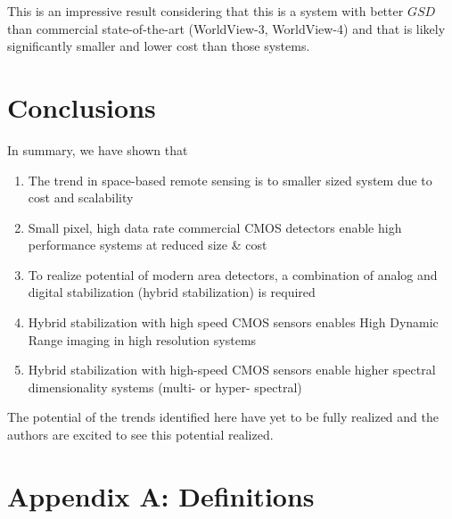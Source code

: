 \documentclass[]{spieman}  %
\begin{document}
This is an impressive result considering that this is a system with better $GSD$ than commercial state-of-the-art (WorldView-3, WorldView-4) and that is likely significantly smaller and lower cost than those systems.

\section{Conclusions}
\label{sec:conclusions}

In summary, we have shown that

\begin{enumerate}
    \item The trend in space-based remote sensing is to smaller sized system due to cost and scalability
    \item Small pixel, high data rate commercial CMOS detectors enable high performance systems at reduced size \& cost
    \item To realize potential of modern area detectors, a combination of analog and digital stabilization (hybrid stabilization) is required
    \item Hybrid stabilization with high speed CMOS sensors enables High Dynamic Range imaging in high resolution systems
    \item Hybrid stabilization with high-speed CMOS sensors enable higher spectral dimensionality systems (multi- or hyper- spectral)
\end{enumerate}

The potential of the trends identified here have yet to be fully realized and the authors are excited to see this potential realized.

\section{Appendix A: Definitions}
\label{sec:appendix_a}

\end{document}
